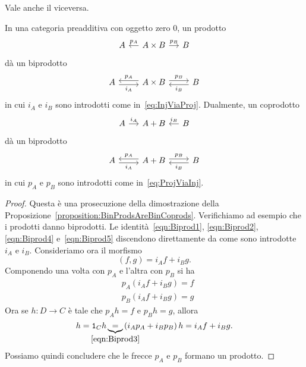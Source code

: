 Vale anche il viceversa.

\begin{proposition}\label{proposition:ProdsAndCoprodsAreBiprods}
  In una categoria preadditiva con oggetto zero \(0\), un prodotto
  \[
    \begin{tikzcd}[column sep=small]
      A & A \times B \ar["{p_A}", l, swap] \ar["{p_B}", r] & B
    \end{tikzcd}
  \]
  dà un biprodotto
  \[
    \begin{tikzcd}
      A \ar["{i_A}", r, shift right, swap] & A \times B \ar["{p_A}", l,
      shift right, swap] \ar["{p_B}", r, shift left] & B \ar["{i_B}", l,
      shift left]
    \end{tikzcd}
  \]
  in cui \(i_A\) e \(i_B\) sono introdotti come
  in~\eqref{eq:InjViaProj}. Dualmente, un coprodotto
  \[
    \begin{tikzcd}[column sep=small]
      A \ar["{i_A}", r] & A + B & B \ar["{i_B}", l, swap]
    \end{tikzcd}
  \]
  dà un biprodotto
  \[
    \begin{tikzcd}
      A \ar["{i_A}", r, shift right, swap] & A+B \ar["{p_A}", l, shift
      right, swap] \ar["{p_B}", r, shift left] & B \ar["{i_B}", l, shift
      left]
    \end{tikzcd}
  \]
  in cui \(p_A\) e \(p_B\) sono introdotti come
  in~\eqref{eq:ProjViaInj}.
\end{proposition}

\begin{proof}
  Questa è una prosecuzione della dimostrazione della
  Proposizione~\ref{proposition:BinProdsAreBinCoprods}. Verifichiamo ad
  esempio che i prodotti danno biprodotti. Le
  identità~\eqref{eqn:Biprod1}, \eqref{eqn:Biprod2}, \eqref{eqn:Biprod4}
  e~\eqref{eqn:Biprod5} discendono direttamente da come sono introdotte
  \(i_A\) e \(i_B\). Consideriamo ora il morfismo
  \[
    (f, g) = i_A f + i_B g .
  \]
  Componendo una volta con \(p_A\) e l'altra con \(p_B\) si ha
  \begin{align*}
    & p_A \left( i_A f + i_B g \right) = f \\
    & p_B \left( i_A f + i_B g \right) = g
  \end{align*}
  Ora se \(h : D \to C\) è tale che \(p_A h = f\) e \(p_B h = g\),
  allora
  \[
    h = \id_C h \underbrace{=}_{\mathclap{\eqref{eqn:Biprod3}}} \left(
      i_A p_A + i_B p_B \right) h = i_A f + i_B g .
  \]
  Possiamo quindi concludere che le frecce \(p_A\) e \(p_B\) formano un
  prodotto.
\end{proof}


